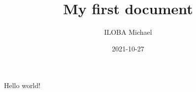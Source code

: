 \documentclass{article}
\title{My first document}
\date{2021-10-27}
\author{ILOBA Michael}
\begin{document}
	\maketitle
	\newpage
	Hello world!
	
\end{document}
